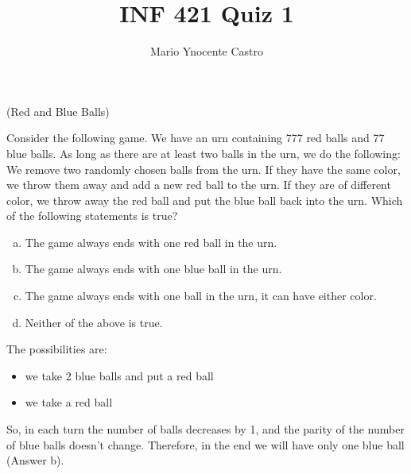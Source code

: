 \documentclass[10pt,a4paper,oneside]{article}
\newenvironment{exercice}[1][Exercice]{\begin{trivlist}
\item[\hskip \labelsep {\bfseries #1}]}{\end{trivlist}}
\newenvironment{solution}[1][Solution]{\begin{trivlist}
\item[\hskip \labelsep {\bfseries #1}]}{\end{trivlist}}
\begin{document}
\title{INF 421 Quiz 1}
\author{Mario Ynocente Castro}

\maketitle


\begin{exercice} (Red and Blue Balls)

Consider the following game. We have an urn containing 777 red balls and
77 blue balls. As long as there are at least two balls in the urn, we do the
following: We remove two randomly chosen balls from the urn. If they have
the same color, we throw them away and add a new red ball to the urn. If
they are of different color, we throw away the red ball and put the blue ball
back into the urn. Which of the following statements is true?

\begin{enumerate}[(a)]
\item
The game always ends with one red ball in the urn.
\item
The game always ends with one blue ball in the urn.
\item
The game always ends with one ball in the urn, it can have either color.
\item
Neither of the above is true.
\end{enumerate}

\end{exercice}


\begin{solution}

The possibilities are:

\begin{itemize}
\item
we take 2 blue balls and put a red ball
\item
we take a red ball
\end{itemize}

So, in each turn the number of balls decreases by 1, and the parity of the number of blue balls doesn't change. Therefore, in the end we will have only one blue ball (Answer b).

\end{solution}
\end{document}
